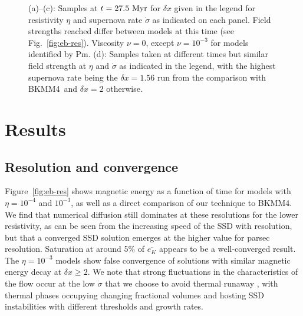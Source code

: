 \documentclass[preprint2]{aastex63}
\newcommand\dx{ {\delta x}}
\newcommand\Myr{~ {\rm Myr}}
\newcommand\BKM{{\sf BKMM4}}
\newcommand{\fg}[1]{\textcolor{midgreen}{#1}}
\newcommand{\mm}[1]{\textcolor{mypurple}{#1}}
\begin{document}
\begin{figure}
{ (a)--(c): \fg{Samples at $t=27.5\Myr$ for $\dx$ \fg{given
    in the legend} for
 resistivity $\eta$ and supernova rate $\dot{\sigma}$ as indicated
 \fg{on each panel.  \fg{Field strengths reached differ between models} at
 this time (see Fig.~\ref{fig:eb-res}). Viscosity}
 $\nu=0$, except $\nu=10^{-3}$ for models identified by Pm.
 (d): Samples taken \fg{at different times but} similar field strength at
 $\eta$ \fg{and} $\dot\sigma$ as indicated \fg{in the legend}, \fg{with the
 highest supernova rate being the $\dx = 1.56$ run from the comparison with
 \BKM\ }and $\dx=2$ otherwise.}
 \label{fig:3power}}
\end{figure}

\section{Results} \label{sec:results}

\subsection{\fg{Resolution and convergence}} \label{sec:conv}
 \fg{Figure~\ref{fig:eb-res} shows magnetic energy as a function of time for
 models with $\eta = 10^{-4}$ and $10^{-3}$, as well as a direct comparison of
 our technique to \BKM. We find that numerical diffusion still dominates at
 these resolutions for the lower resistivity, as can be seen from the
 increasing speed of the SSD with resolution, but that a converged SSD solution
 emerges at the higher value for parsec resolution.}
 Saturation at around 5\% of $\overline{e_K}$ appears to be a well-converged
 result.
 \fg{The $\eta = 10^{-3}$ models show} false convergence
 \citep{FMA91} of solutions with similar magnetic energy decay at $\dx\geq2$.
 \fg{We note that strong fluctuations in the characteristics of the flow
 \fg{occur at the} low $\dot\sigma$ \fg{that we choose to avoid thermal runaway
 \citep{LOCBN15},} with thermal phases occupying changing fractional volumes
 \citep[e.g.][]{gatto2015} and hosting SSD instabilities with different 
 thresholds and growth rates.
 }
\end{document}
